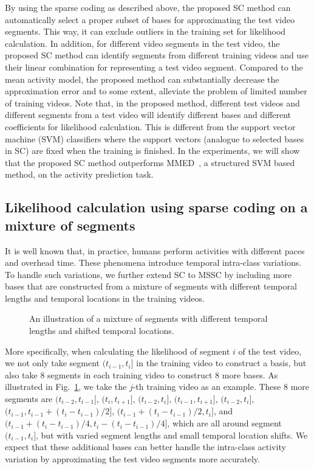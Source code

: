 By using the sparse coding as described above, the proposed SC method can
automatically select a proper subset of bases for approximating the test video
segments. This way, it can exclude outliers in the training set for likelihood
calculation. In addition, for different video segments in the test video, the
proposed SC method can identify segments from different training videos and use
their linear combination for representing a test video segment. Compared to the
mean activity model, the proposed method can substantially decrease the
approximation error and to some extent, alleviate the problem of limited number
of training videos. Note that, in the proposed method, different test videos
and different segments from a test video will identify different bases and
different coefficients for likelihood calculation.  This is different from the
support vector machine (SVM) classifiers where the support vectors (analogue to
selected bases in SC) are fixed when the training is finished. In the
experiments, we will show that the proposed SC method outperforms
MMED~\cite{MMED2012}, a structured SVM based method, on the activity prediction
task.

\subsection{Likelihood calculation using sparse coding on a mixture of segments}
\label{sec:likelihood_MSSC}
It is well known that, in practice, humans perform activities with different
paces and overhead time. These phenomena introduce temporal intra-class
variations.  To handle such variations, we further extend SC to MSSC by
including more bases that are constructed from a mixture of segments with
different temporal lengths and temporal locations in the training videos.

\begin{figure}[htbp]
  \begin{center}
  \end{center}
  \vspace{-4mm}
  \caption{An illustration of a mixture of segments with different temporal lengths
    and shifted temporal locations.}
  \vspace{-4mm}
  \label{fig:MSSC_illustration}
\end{figure}

More specifically, when calculating the likelihood of segment $i$ of the test
video, we not only take segment $(t_{i-1}, t_i]$ in the training video to
construct a basis, but also take $8$ segments in each training video to
construct $8$ more bases.  As illustrated in Fig.~\ref{fig:MSSC_illustration},
we take the $j$-th training video as an example.  These $8$ more segments are
$(t_{i-2}, t_{i-1}]$, $(t_i, t_{i+1}]$, $(t_{i-2}, t_i]$, $(t_{i-1}, t_{i+1}]$,
$(t_{i-2}, t_{i}]$, $(t_{i-1}, t_{i-1}+(t_i-t_{i-1})/2]$,
$(t_{i-1}+(t_i-t_{i-1})/2, t_i]$, and $(t_{i-1}+(t_i-t_{i-1})/4,
t_{i}-(t_i-t_{i-1})/4]$, which are all around segment $(t_{i-1}, t_i]$, but
with varied segment lengths and small temporal location shifts. We expect that
these additional bases can better handle the intra-class activity variation by
approximating the test video segments more accurately.

